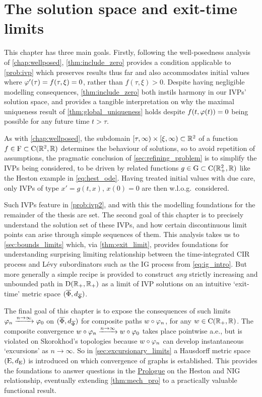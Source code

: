 \clearpage
\section{The solution space and exit-time limits}\label{chap:solutions}

This chapter has three main goals. Firstly, following the well-posedness analysis of \autoref{chap:wellposed}, \autoref{thm:include_zero} provides a condition applicable to \autoref{prob:ivp} which preserves results thus far and also accommodates initial values where $\varphi'(\tau)=f(\tau,\xi) = 0$, rather than $f(\tau,\xi)>0$. Despite having negligible modelling consequences, \autoref{thm:include_zero} both instils harmony in our IVPs' solution space, and provides a tangible interpretation on why the maximal uniqueness result of \autoref{thm:global_uniqueness} holds despite $f(t,\varphi(t)) = 0$ being possible for any future time $t>\tau$.

As with \autoref{chap:wellposed}, the subdomain $[\tau,\infty)\times[\xi,\infty)\subset\mathbb{R}^2$ of a function $f\in\mathrm{F}\subset\mathrm{C}(\mathbb{R}^2,\mathbb{R})$ determines the behaviour of solutions, so to avoid repetition of assumptions, the pragmatic conclusion of \autoref{sec:refining_problem} is to simplify the IVPs being considered, to be driven by related functions $g\in\mathrm{G}\subset\mathrm{C}(\mathbb{R}_+^2,\mathbb{R})$ like the Heston example in \autoref{eq:hest_ode}. Having treated initial values with due care, only IVPs of type $x'=g(t,x)$, $x(0)=0$ are then w.l.o.g.~considered.

Such IVPs feature in \autoref{prob:ivp2}, and with this the modelling foundations for the remainder of the thesis are set. The second goal of this chapter is to precisely understand the solution set of these IVPs, and how certain discontinuous limit points can arise through simple sequences of them. This analysis takes us to \autoref{sec:bounds_limits} which, via \autoref{thm:exit_limit}, provides foundations for understanding surprising limiting relationship between the time-integrated CIR process and L\'evy subordinators such as the IG process from \autoref{eq:ig_intro}. But more generally a simple recipe is provided to construct \emph{any} strictly increasing and unbounded path in $\mathrm{D}(\mathbb{R}_+,\mathbb{R}_+)$ as a limit of IVP solutions on an intuitive `exit-time' metric space $(\overline{\Phi},d_{\overline{\Phi}})$.

The final goal of this chapter is to expose the consequences of such limits $\varphi_n\xrightarrow{n\to\infty}\varphi_0$ on $(\overline{\Phi},d_{\overline{\Phi}})$ for composite paths $w\circ\varphi_n$, for any $w\in\mathrm{C}(\mathbb{R}_+,\mathbb{R})$. The composite convergence $w\circ\varphi_n\xrightarrow{n\to\infty}w\circ\varphi_0$ takes place pointwise a.e., but is violated on Skorokhod's topologies because $w\circ\varphi_n$ can develop instantaneous `excursions' as $n\to\infty$. So in \autoref{sec:excursionary_limits} a Hausdorff metric space $(\mathrm{E},d_{\mathrm{E}})$ is introduced on which convergence of graphs is established. This provides the foundations to answer questions in the \hyperlink{prologue}{Prologue} on the Heston and NIG relationship, eventually extending \autoref{thm:mech_pro} to a practically valuable functional result.

